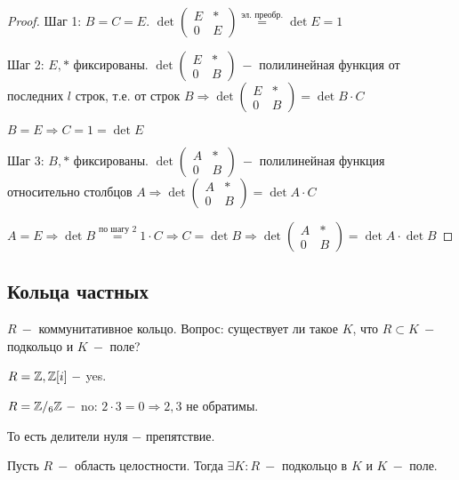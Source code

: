 \begin{proof}
    Шаг 1: $B=C=E$. $\det\left(\begin{array}{c|c} E & * \\
    \hline
    0 & E
    \end{array}\right)\overset{\text{эл. преобр.}}{=}\det E=1$

    Шаг 2: $E, *$ фиксированы. $\det\left(\begin{array}{c|c} E & * \\
    \hline
    0 & B
    \end{array}\right)\ -$ полилинейная функция от последних $l$ строк, т.е. от строк $B\Rightarrow\det\left(\begin{array}{c|c} E & * \\
    \hline
    0 & B
    \end{array}\right)=\det B\cdot C$

    $B=E\Rightarrow C=1=\det E$

    Шаг 3: $B, *$ фиксированы. $\det\left(\begin{array}{c|c} A & * \\
    \hline
    0 & B
    \end{array}\right)\ -$ полилинейная функция относительно столбцов $A\Rightarrow\det\left(\begin{array}{c|c} A & * \\
    \hline
    0 & B
    \end{array}\right)=\det A\cdot C$

    $A=E\Rightarrow \det B\overset{\text{по шагу 2}}{=}1\cdot C\Rightarrow C=\det B\Rightarrow \det\left(\begin{array}{c|c} A & * \\
    \hline
    0 & B
    \end{array}\right)=\det A\cdot\det B$
\end{proof}

\subsection{Кольца частных}

$R\ -$ коммунитативное кольцо. Вопрос: существует ли такое $K$, что $R\subset K\ -$ подкольцо и $K\ -$ поле?

$R=\mathbb{Z}, \mathbb{Z}[i]\ -$ yes.

$R=\mathbb{Z}/_6 \mathbb{Z}\ -$  no: $2\cdot 3=0\Rightarrow 2,3$ не обратимы.

То есть делители нуля $-$ препятствие.

\begin{theorem}
    Пусть $R\ -$ область целостности. Тогда $\exists K:R\ -$ подкольцо в $K$ и $K\ -$ поле.
\end{theorem}

